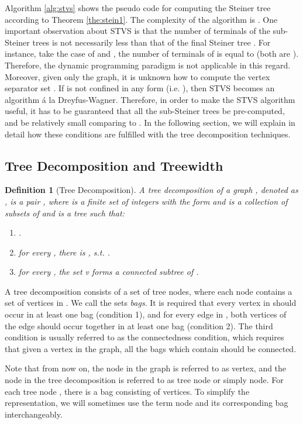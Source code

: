 \documentclass[preprint,12pt]{elsarticle}
\newtheorem{definition}{Definition}
\begin{document}
Algorithm \ref{alg:stvs} shows the pseudo code for computing the Steiner tree according 
to Theorem \ref{the:stein1}. The complexity of the algorithm is .
One important observation about STVS   is that
the number of terminals of the sub-Steiner trees is not necessarily less than
that of the final Steiner tree . 
For instance, take the case of  and ,
the number of terminals of  is equal to 
 (both are ). Therefore, the dynamic programming
paradigm is not applicable in this regard.
Moreover, given only the graph, it is unknown how to compute the vertex separator set .
If  is not confined in any form (i.e. ), then  STVS becomes
an algorithm \'a la Dreyfus-Wagner.
Therefore, in order to make the STVS algorithm useful, it has to be guaranteed that all 
the sub-Steiner trees be pre-computed, and  be relatively small comparing to .
In the following section, we will explain in detail how these conditions 
are fulfilled with the tree decomposition techniques. 

\subsection{Tree Decomposition and Treewidth}


\begin{definition} [Tree Decomposition]
A tree decomposition  of a graph , denoted as , is a pair , where  is a finite set of integers with the form  and  is a collection of subsets of  and  is a tree such that:
\begin{enumerate}
	\item  .
	\item for every , there is , s.t. .
	\item for every , the set   v  forms a connected subtree of  .
\end{enumerate}
\label{def:TD}
\end{definition}

A tree decomposition consists of a set of tree nodes, where each node contains a set of vertices in . We call the sets  \emph {bags}. It is required that every vertex in  should occur in at least one bag (condition 1), and for every edge in , both vertices of the edge should occur together in at least one bag (condition 2). The third condition is usually referred to as the connectedness condition, which requires that given a vertex  in the graph, all the bags which contain  should be connected.

Note that from now on, the node in the graph  is referred to as vertex, and the node in the tree decomposition is referred to as tree node or simply node. For each tree node , there is a bag  consisting of vertices. To simplify the representation, we will sometimes use the term node and its corresponding bag interchangeably. 
\end{document}
